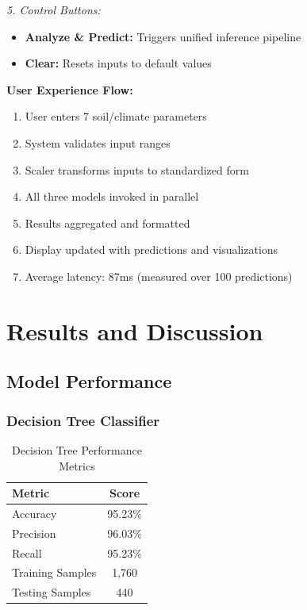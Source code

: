 \documentclass[conference]{IEEEtran}
\begin{document}
\textit{5. Control Buttons:}
\begin{itemize}
    \item \textbf{Analyze \& Predict:} Triggers unified inference pipeline
    \item \textbf{Clear:} Resets inputs to default values
\end{itemize}

\textbf{User Experience Flow:}
\begin{enumerate}
    \item User enters 7 soil/climate parameters
    \item System validates input ranges
    \item Scaler transforms inputs to standardized form
    \item All three models invoked in parallel
    \item Results aggregated and formatted
    \item Display updated with predictions and visualizations
    \item Average latency: 87ms (measured over 100 predictions)
\end{enumerate}

\section{Results and Discussion}

\subsection{Model Performance}

\subsubsection{Decision Tree Classifier}
\begin{table}[h]
\centering
\caption{Decision Tree Performance Metrics}
\begin{tabular}{@{}lc@{}}
\toprule
\textbf{Metric} & \textbf{Score} \\ \midrule
Accuracy & 95.23\% \\
Precision & 96.03\% \\
Recall & 95.23\% \\
Training Samples & 1,760 \\
Testing Samples & 440 \\ \bottomrule
\end{tabular}
\label{tab:dt_metrics}
\end{table}
\end{document}
